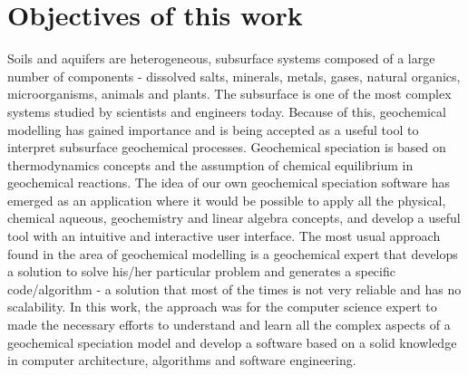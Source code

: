 \documentclass[ppgc,mestrado,English]{iiufrgs}
\begin{document}
\section{Objectives of this work}
Soils and aquifers are heterogeneous, subsurface systems composed of a large number of components - dissolved salts, minerals, metals, gases, natural organics, microorganisms, animals and plants. The subsurface is one of the most complex systems studied by scientists and engineers today. Because of this, geochemical modelling has gained importance and is being accepted as a useful tool to interpret subsurface geochemical processes. Geochemical speciation is based on thermodynamics concepts and the assumption of chemical equilibrium in geochemical reactions.
The idea of our own geochemical speciation software has emerged as an application where it would be possible to apply all the physical, chemical aqueous, geochemistry and linear algebra concepts, and develop a useful tool with an intuitive and interactive user interface. The most usual approach found in the area of geochemical modelling is a geochemical expert that develops a solution to solve his/her particular problem and generates a specific code/algorithm - a solution that most of the times is not very reliable and has no scalability. In this work, the approach was for the computer science expert to made the necessary efforts to understand and learn all the complex aspects of a geochemical speciation model and develop a software based on a solid knowledge in computer architecture, algorithms and software engineering. 
\end{document}

